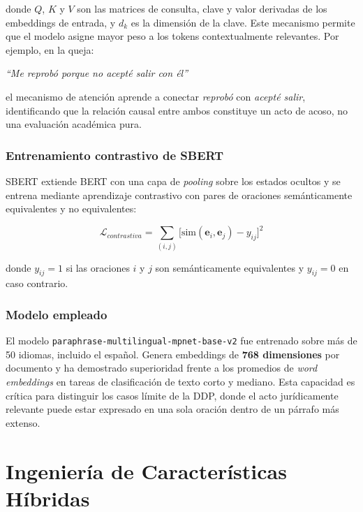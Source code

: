 donde $Q$, $K$ y $V$ son las matrices de consulta, clave y valor derivadas
de los embeddings de entrada, y $d_k$ es la dimensión de la clave.\cite{vaswani2017} Este
mecanismo permite que el modelo asigne mayor peso a los tokens contextualmente
relevantes. Por ejemplo, en la queja:

\begin{center}
  \textit{``Me reprobó porque no acepté salir con él''}
\end{center}

\noindent el mecanismo de atención aprende a conectar \textit{reprobó} con
\textit{acepté salir}, identificando que la relación causal entre ambos
constituye un acto de acoso, no una evaluación académica pura.

\subsubsection*{Entrenamiento contrastivo de SBERT}

SBERT extiende BERT con una capa de \textit{pooling} sobre los estados ocultos
y se entrena mediante aprendizaje contrastivo con pares de oraciones
semánticamente equivalentes y no equivalentes:

\begin{equation}
  \mathcal{L}_{contrastiva}
  = \sum_{(i,j)} \bigl[\text{sim}(\mathbf{e}_i, \mathbf{e}_j) - y_{ij}\bigr]^2
  \label{eq:contrastiva}
\end{equation}

donde $y_{ij} = 1$ si las oraciones $i$ y $j$ son semánticamente equivalentes
y $y_{ij} = 0$ en caso contrario.

\subsubsection*{Modelo empleado}

El modelo \texttt{paraphrase-multilingual-mpnet-base-v2} fue entrenado sobre
más de 50 idiomas, incluido el español. Genera embeddings de \textbf{768
dimensiones} por documento y ha demostrado superioridad frente a los promedios
de \textit{word embeddings} en tareas de clasificación de texto corto y mediano.
Esta capacidad es crítica para distinguir los casos límite de la DDP, donde
el acto jurídicamente relevante puede estar expresado en una sola oración dentro
de un párrafo más extenso.

\section{Ingeniería de Características Híbridas}


